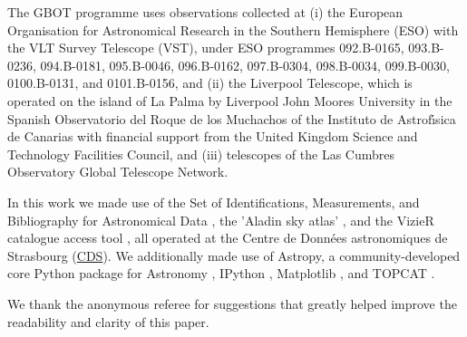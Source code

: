 \documentclass[longauth]{aa_gaia} %
\begin{document}
\begin{acknowledgements}
The GBOT programme \citep{2016A&A...595A...1G, 2014SPIE.9149E..0PA} uses observations collected at
(i) the European Organisation for Astronomical Research in the Southern Hemisphere (ESO) with the
VLT Survey Telescope (VST), under ESO programmes 092.B-0165, 093.B-0236, 094.B-0181, 095.B-0046,
096.B-0162, 097.B-0304, 098.B-0034, 099.B-0030, 0100.B-0131, and 0101.B-0156, and (ii) the Liverpool
Telescope, which is operated on the island of La Palma by Liverpool John Moores University in the
Spanish Observatorio del Roque de los Muchachos of the Instituto de Astrof\'{\i}sica de Canarias
with financial support from the United Kingdom Science and Technology Facilities Council, and (iii)
telescopes of the Las Cumbres Observatory Global Telescope Network.

In this work we made use of the Set of Identifications, Measurements, and Bibliography for
Astronomical Data \citep[SIMBAD;][]{2000A&AS..143....9W}, the 'Aladin sky atlas'
\citep{2000A&AS..143...33B,2014ASPC..485..277B}, and the VizieR catalogue access tool
\citep{2000A&AS..143...23O}, all operated at the Centre de Donn\'ees astronomiques de Strasbourg
(\href{http://cds.u-strasbg.fr/}{CDS}). We additionally made use of Astropy, a community-developed
core Python package for Astronomy \citep{2018arXiv180102634T}, IPython \citep{PER-GRA:2007},
Matplotlib \citep{2007CSE.....9...90H}, and TOPCAT
\citep[\url{http://www.starlink.ac.uk/topcat/}]{2005ASPC..347...29T}.

We thank the anonymous referee for suggestions that greatly helped improve the readability and
clarity of this paper.
\end{acknowledgements}

%
%


%
%
\end{document}
